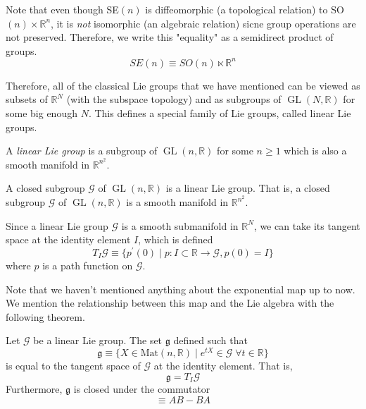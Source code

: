 \documentclass{article}
\DeclareMathOperator{\GL}{GL}
\begin{document}
    Note that even though SE$(n)$ is diffeomorphic (a topological relation) to SO$(n) \times \mathbb{R}^n$, it is \textit{not} isomorphic (an algebraic relation) sicne group operations are not preserved. Therefore, we write this "equality" as a semidirect product of groups. 
    \begin{equation}
      SE(n) \equiv SO(n) \ltimes \mathbb{R}^n
    \end{equation}

    Therefore, all of the classical Lie groups that we have mentioned can be viewed as subsets of $\mathbb{R}^N$ (with the subspace topology) and as subgroups of $\GL(N, \mathbb{R})$ for some big enough $N$. This defines a special family of Lie groups, called linear Lie groups. 

    \begin{definition}
      A \textit{linear Lie group} is a subgroup of $\GL(n, \mathbb{R})$ for some $n \geq 1$ which is also a smooth manifold in $\mathbb{R}^{n^2}$. 
    \end{definition}

    \begin{theorem}
      A closed subgroup $\mathcal{G}$ of $\GL(n, \mathbb{R})$ is a linear Lie group. That is, a closed subgroup $\mathcal{G}$ of $\GL(n, \mathbb{R})$ is a smooth manifold in $\mathbb{R}^{n^2}$.
    \end{theorem}

    \begin{definition}
      Since a linear Lie group $\mathcal{G}$ is a smooth submanifold in $\mathbb{R}^N$, we can take its tangent space at the identity element $I$, which is defined 
      \begin{equation}
        T_I \mathcal{G} \equiv \{p^\prime (0) \;|\; p: I \subset \mathbb{R} \longrightarrow \mathcal{G}, p(0) = I\}
      \end{equation}
      where $p$ is a path function on $\mathcal{G}$. 
    \end{definition}

    Note that we haven't mentioned anything about the exponential map up to now. We mention the relationship between this map and the Lie algebra with the following theorem. 

    \begin{theorem}
      Let $\mathcal{G}$ be a linear Lie group. The set $\mathfrak{g}$ defined such that
      \begin{equation}
        \mathfrak{g} \equiv \{X \in \text{Mat}(n, \mathbb{R}) \; | \; e^{t X} \in \mathcal{G} \; \forall t \in \mathbb{R}\}
      \end{equation}
      is equal to the tangent space of $\mathcal{G}$ at the identity element. That is, 
      \begin{equation}
        \mathfrak{g} = T_I \mathcal{G}
      \end{equation}
      Furthermore, $\mathfrak{g}$ is closed under the commutator 
      \begin{equation}
        [A,B] \equiv A B - B A
      \end{equation}
    \end{theorem}
\end{document}
